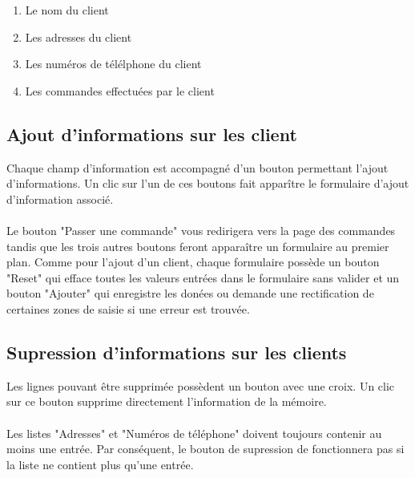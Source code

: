 \begin{enumerate}
  \item Le nom du client
  \item Les adresses du client
  \item Les numéros de télélphone du client
  \item Les commandes effectuées par le client
\end{enumerate}

\subsection{Ajout d'informations sur les client}
Chaque champ d'information est accompagné d'un bouton permettant l'ajout d'informations.
Un clic sur l'un de ces boutons fait apparître le formulaire d'ajout
d'information associé.

\paragraph{}
Le bouton "Passer une commande" vous redirigera vers la page des commandes
tandis que les trois autres boutons feront apparaître un formulaire au premier
plan. Comme pour l'ajout d'un client, chaque formulaire possède un bouton "Reset"
qui efface toutes les valeurs entrées dans le formulaire sans valider et un
bouton "Ajouter" qui enregistre les donées ou demande une rectification de
certaines zones de saisie si une erreur est trouvée.

\subsection{Supression d'informations sur les clients}
Les lignes pouvant être supprimée possèdent
un bouton avec une croix. Un clic sur ce bouton supprime directement
l'information de la mémoire.

\paragraph{}
Les listes "Adresses" et "Numéros de téléphone" doivent toujours contenir au
moins une entrée. Par conséquent, le bouton de supression de fonctionnera pas
si la liste ne contient plus qu'une entrée.
